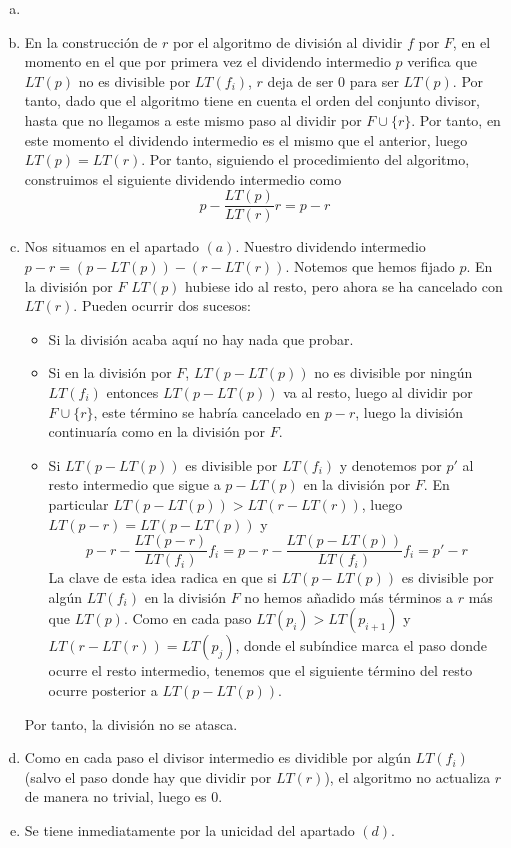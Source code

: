 \documentclass[twoside]{article}
\begin{document}
\begin{solucion}
\begin{enumerate}[a.]
\item[]
\item En la construcción de $r$ por el algoritmo de división al dividir $f$ por $F$, en el momento en el que por primera vez el dividendo intermedio $p$ verifica que $LT(p)$ no es divisible por $LT(f_i)$, $r$ deja de ser $0$ para ser $LT(p)$.  Por tanto, dado que el algoritmo tiene en cuenta el orden del conjunto divisor, hasta que no llegamos a este mismo paso al dividir por $F\cup\{r\}$. Por tanto, en este momento el dividendo intermedio es el mismo que el anterior, luego $LT(p)=LT(r)$. Por tanto, siguiendo el procedimiento del algoritmo, construimos el siguiente dividendo intermedio como 
$$
p-\frac{LT(p)}{LT(r)}r=p-r
$$
\item Nos situamos en el apartado $(a)$. Nuestro dividendo intermedio $p-r = (p-LT(p))-(r-LT(r))$. Notemos que hemos fijado $p$. En la división por $F$  $LT(p)$ hubiese ido al resto, pero ahora se ha cancelado con $LT(r)$. Pueden ocurrir dos sucesos:
\begin{itemize}
\item Si la división acaba aquí no hay nada que probar.
\item Si en la división por $F$, $LT(p-LT(p))$ no es divisible por ningún $LT(f_i)$ entonces $LT(p-LT(p))$ va al resto, luego  al dividir por $F\cup\{r\}$, este término se habría cancelado en $p-r$, luego la división continuaría como en la división por $F$.
\item Si $LT(p-LT(p))$ es divisible por $LT(f_i)$ y denotemos por $p'$ al resto intermedio que sigue a $p-LT(p)$ en la división por $F$. En particular $LT(p-LT(p))>LT(r-LT(r))$, luego $LT(p-r)=LT(p-LT(p))$ y
$$
p - r - \frac{LT(p-r)}{LT(f_i)}f_i =p - r - \frac{LT(p-LT(p))}{LT(f_i)}f_i= p'-r
$$
La clave de esta idea radica en que si $LT(p-LT(p))$ es divisible por algún $LT(f_i)$ en la división $F$ no hemos añadido más términos a $r$ más que $LT(p)$. Como en cada paso $LT(p_i)>LT(p_{i+1})$ y $LT(r-LT(r))= LT(p_j)$, donde el subíndice marca el paso donde ocurre el resto intermedio, tenemos que el siguiente término del resto ocurre posterior a $LT(p-LT(p))$.
\end{itemize}
Por tanto, la división no se atasca. 
\item Como en cada paso el divisor intermedio es dividible por algún $LT(f_i)$ (salvo el paso donde hay que dividir por $LT(r)$), el algoritmo no actualiza $r$ de manera no trivial, luego es $0$.
\item Se tiene inmediatamente por la unicidad del apartado $(d)$.
\end{enumerate}
\end{solucion}
\end{document}
